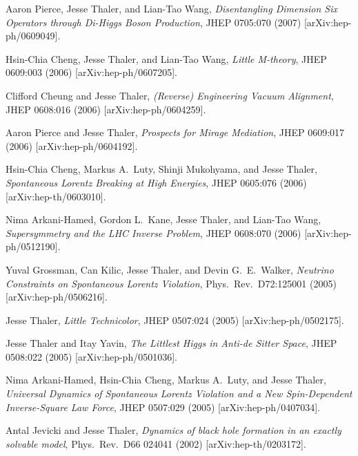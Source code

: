 \begin{list}{[]\addtocounter{jessecount}{-1}}{\leftmargin=3em \itemsep=4pt}
\item
 Aaron Pierce, Jesse Thaler, and Lian-Tao Wang,
\emph{Disentangling Dimension Six Operators through Di-Higgs Boson Production},
JHEP 0705:070 (2007)
[arXiv:hep-ph/0609049].

\item
 Hsin-Chia Cheng, Jesse Thaler, and Lian-Tao Wang,
\emph{Little M-theory},
JHEP 0609:003 (2006)
[arXiv:hep-ph/0607205].

\item
 Clifford Cheung and Jesse Thaler,
\emph{(Reverse) Engineering Vacuum Alignment},
JHEP 0608:016 (2006)
[arXiv:hep-ph/0604259].

\item
 Aaron Pierce and Jesse Thaler,
\emph{Prospects for Mirage Mediation},
JHEP 0609:017 (2006)
[arXiv:hep-ph/0604192].

\item
 Hsin-Chia Cheng, Markus A.\ Luty, Shinji Mukohyama, and Jesse Thaler,
\emph{Spontaneous Lorentz Breaking at High Energies},
JHEP 0605:076 (2006)
[arXiv:hep-th/0603010].

\item
 Nima Arkani-Hamed, Gordon L.\ Kane, Jesse Thaler, and Lian-Tao Wang,
\emph{Supersymmetry and the LHC Inverse Problem},
JHEP 0608:070 (2006)
[arXiv:hep-ph/0512190].

\item
 Yuval Grossman, Can Kilic, Jesse Thaler, and Devin G.\ E.\ Walker,
\emph{Neutrino Constraints on Spontaneous Lorentz Violation},
Phys.\ Rev.\ D72:125001 (2005)
[arXiv:hep-ph/0506216].

\item
 Jesse Thaler,
\emph{Little Technicolor},
JHEP 0507:024 (2005)
[arXiv:hep-ph/0502175].

\item
 Jesse Thaler and Itay Yavin,
\emph{The Littlest Higgs in Anti-de Sitter Space},
JHEP 0508:022 (2005)
[arXiv:hep-ph/0501036].

\item
 Nima Arkani-Hamed, Hsin-Chia Cheng, Markus A.\ Luty, and Jesse Thaler,
\emph{Universal Dynamics of Spontaneous Lorentz Violation and a New Spin-Dependent Inverse-Square Law Force},
JHEP 0507:029 (2005)
[arXiv:hep-ph/0407034].

\item
 Antal Jevicki and Jesse Thaler,
\emph{Dynamics of black hole formation in an exactly solvable model},
Phys.\ Rev.\ D66 024041 (2002)
[arXiv:hep-th/0203172].

\end{list}
